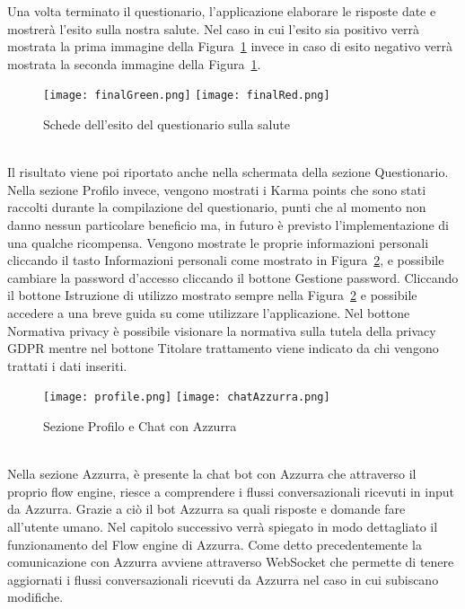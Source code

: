 \begin{trivlist}
	Una volta terminato il questionario, l'applicazione elaborare le risposte date e mostrerà l'esito sulla nostra salute. Nel caso in cui l'esito sia positivo verrà mostrata la prima immagine della Figura~\ref{fig:quefinal} invece in caso di esito negativo verrà mostrata la seconda immagine della Figura~\ref{fig:quefinal}.
	\begin{figure}[h]
		\begin{center}
			\texttt{[image: finalGreen.png]}\hfil
			\texttt{[image: finalRed.png]}
			\caption{Schede dell'esito del questionario sulla salute}\label{fig:quefinal}
		\end{center}
	\end{figure}\\
	Il risultato viene poi riportato anche nella schermata della sezione Questionario.
	\\
	Nella sezione Profilo invece, vengono mostrati i Karma points che sono stati raccolti durante la compilazione del questionario, punti che al momento non danno nessun particolare beneficio ma, in futuro è previsto l'implementazione di una qualche ricompensa. Vengono mostrate le proprie informazioni personali cliccando il tasto Informazioni personali come mostrato in Figura~\ref{fig:profile}, e possibile cambiare la password d'accesso cliccando il bottone Gestione password. Cliccando il bottone Istruzione di utilizzo mostrato sempre nella Figura~\ref{fig:profile} e possibile accedere a una breve guida su come utilizzare l'applicazione. Nel bottone Normativa privacy è possibile visionare la normativa sulla tutela della privacy GDPR mentre nel bottone Titolare trattamento viene indicato da chi vengono trattati i dati inseriti.
	\begin{figure}[h]
		\begin{center}
			\texttt{[image: profile.png]}\hfil
			\texttt{[image: chatAzzurra.png]}
			\caption{Sezione Profilo e Chat con Azzurra}\label{fig:profile}
		\end{center}
	\end{figure}\\
	Nella sezione Azzurra, è presente la chat \gls{bot}\ap{[g]} con Azzurra che attraverso il proprio flow engine, riesce a comprendere i flussi conversazionali ricevuti in input da Azzurra. Grazie a ciò il \gls{bot}\ap{[g]} Azzurra sa quali risposte e domande fare all'utente umano. Nel capitolo successivo verrà spiegato in modo dettagliato il funzionamento del Flow engine di Azzurra. Come detto precedentemente la comunicazione con Azzurra avviene attraverso \gls{WebSocket}\ap{[g]} che permette di tenere aggiornati i flussi conversazionali ricevuti da Azzurra nel caso in cui subiscano modifiche.	
	
\end{trivlist}

